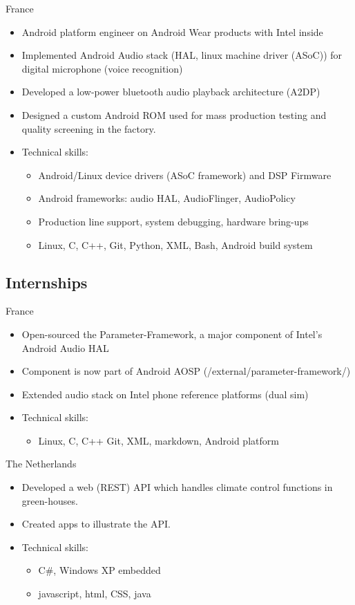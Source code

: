 \documentclass[a4paper,10pt,sans]{moderncv}
\begin{document}
{}{France}
{
    \begin{itemize}
    \item Android platform engineer on Android Wear products with Intel inside
    \item Implemented Android Audio stack (HAL, linux machine driver (ASoC)) for digital microphone (voice recognition)
    \item Developed a low-power bluetooth audio playback architecture (A2DP)
    \item Designed a custom Android ROM used for mass production testing and quality screening in the factory.
    \item Technical skills:
      \begin{itemize}
        \item Android/Linux device drivers (ASoC framework) and DSP Firmware
        \item Android frameworks: audio HAL, AudioFlinger, AudioPolicy
        \item Production line support, system debugging, hardware bring-ups
        \item Linux, C, C++, Git, Python, XML, Bash, Android build system
      \end{itemize}
    \end{itemize}
}

\subsection{Internships}
{}{France}
{
  \begin{itemize}
    \item Open-sourced the Parameter-Framework, a major component of Intel's Android Audio HAL
    \item Component is now part of Android AOSP (/external/parameter-framework/)
    \item Extended audio stack on Intel phone reference platforms (dual sim)
    \item Technical skills:
    \begin{itemize}
      \item Linux, C, C++ Git, XML, markdown, Android platform
    \end{itemize}
  \end{itemize}
}

{}{The Netherlands}
{
  \begin{itemize}
    \item Developed a web (REST) API which handles climate control functions in green-houses.
    \item Created apps to illustrate the API.
    \item Technical skills:
    \begin{itemize}
      \item C\#, Windows XP embedded
      \item javascript, html, CSS, java
    \end{itemize}
  \end{itemize}
}
\end{document}
